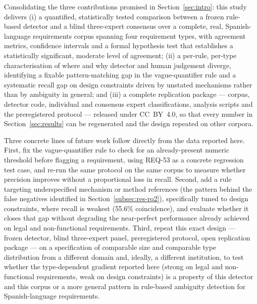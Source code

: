 \documentclass[pdflatex,sn-mathphys-num]{sn-jnl}
\theoremstyle{thmstyleone}%
\theoremstyle{thmstyletwo}%
\theoremstyle{thmstylethree}%
\begin{document}
	Consolidating the three contributions promised in Section~\ref{sec:intro}: this
	study delivers (i) a quantified, statistically tested comparison between a
	frozen rule-based detector and a blind three-expert consensus over a complete,
	real, Spanish-language requirements corpus spanning four requirement types,
	with agreement metrics, confidence intervals and a formal hypothesis test that
	establishes a statistically significant, moderate level of agreement; (ii) a
	per-rule, per-type characterisation of where and why detector and human
	judgement diverge, identifying a fixable pattern-matching gap in the
	vague-quantifier rule and a systematic recall gap on design constraints driven
	by unstated mechanisms rather than by ambiguity in general; and (iii) a
	complete replication package --- corpus, detector code, individual and
	consensus expert classifications, analysis scripts and the preregistered
	protocol --- released under CC~BY~4.0, so that every number in
	Section~\ref{sec:results} can be regenerated and the design repeated on other
	corpora.
	
	Three concrete lines of future work follow directly from the data reported
	here. First, fix the vague-quantifier rule to check for an already-present
	numeric threshold before flagging a requirement, using REQ-53 as a concrete
	regression test case, and re-run the same protocol on the same corpus to
	measure whether precision improves without a proportional loss in recall.
	Second, add a rule targeting underspecified mechanism or method references
	(the pattern behind the false negatives identified in
	Section~\ref{subsec:res-rq2}), specifically tuned to design constraints, where
	recall is weakest (55.6\% coincidence), and evaluate whether it closes that
	gap without degrading the near-perfect performance already achieved on legal
	and non-functional requirements. Third, repeat this exact design --- frozen
	detector, blind three-expert panel, preregistered protocol, open replication
	package --- on a specification of comparable size and comparable type
	distribution from a different domain and, ideally, a different institution, to
	test whether the type-dependent gradient reported here (strong on legal and
	non-functional requirements, weak on design constraints) is a property of this
	detector and this corpus or a more general pattern in rule-based ambiguity
	detection for Spanish-language requirements.
	
	\backmatter
	
\end{document}
